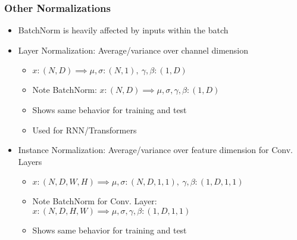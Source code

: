 \subsubsection*{Other Normalizations}
\begin{itemize}
    \item BatchNorm is heavily affected by inputs within the batch
    \item Layer Normalization: Average/variance over channel dimension
    \begin{itemize}
        \item $x:(N,D)\implies\mu,\sigma:(N,1),~\gamma,\beta:(1,D)$
        \item Note BatchNorm: $x:(N,D)\implies\mu,\sigma,\gamma,\beta:(1,D)$
        \item Shows same behavior for training and test
        \item Used for RNN/Transformers
    \end{itemize}
    \item Instance Normalization: Average/variance over feature dimension for Conv. Layers
    \begin{itemize}
        \item $x:(N,D,W,H)\implies\mu,\sigma:(N,D,1,1),~\gamma,\beta:(1,D,1,1)$
        \item Note BatchNorm for Conv. Layer: $x:(N,D,H,W)\implies\mu,\sigma,\gamma,\beta:(1,D,1,1)$
        \item Shows same behavior for training and test
    \end{itemize}
\end{itemize}
\begin{figures}
\end{figures}
